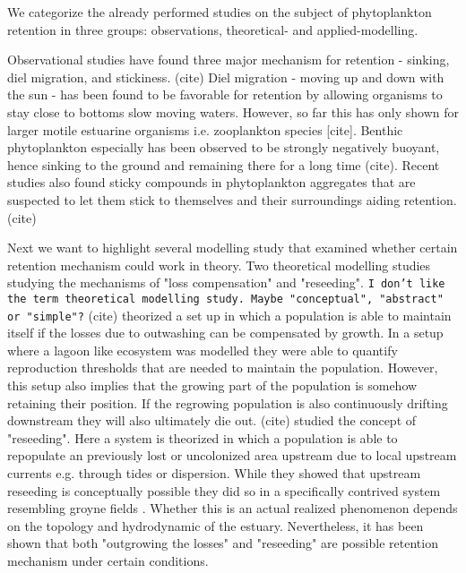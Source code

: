 

We categorize the already performed studies on the subject of phytoplankton retention in three groups: observations, theoretical- and applied-modelling.

Observational studies have found three major mechanism for retention - sinking, diel migration, and stickiness. (cite)
Diel migration - moving up and down with the sun -  has been found to be favorable for retention by allowing organisms to stay close to bottoms slow moving waters.
However, so far this has only shown for larger motile estuarine organisms i.e. zooplankton species [cite].
Benthic phytoplankton especially has been observed to be strongly negatively buoyant, hence sinking to the ground and remaining there for a long time (cite).
Recent studies also found sticky compounds in phytoplankton aggregates that are suspected to let them stick to themselves and their surroundings aiding retention. (cite)



Next we want to highlight several modelling study that examined whether certain retention mechanism could work in theory.
Two theoretical modelling studies studying the mechanisms of "loss compensation" and "reseeding".
\texttt{I don't like the term theoretical modelling study. Maybe "conceptual", "abstract" or "simple"?}
(cite) theorized a set up in which a population is able to maintain itself if the losses due to outwashing can be compensated by growth.
In a setup where a lagoon like ecosystem was modelled they were able to quantify reproduction thresholds that are needed to maintain the population.
However, this setup also implies that the growing part of the population is somehow retaining their position.
If the regrowing population is also continuously drifting downstream they will also ultimately die out.
(cite) studied the concept of "reseeding".
Here a system is theorized in which a population is able to repopulate an previously 
lost or uncolonized area upstream due to local upstream currents e.g. through tides or dispersion.
While they showed that upstream reseeding is conceptually possible they did so in a specifically contrived system resembling groyne fields .
Whether this is an actual realized phenomenon depends on the topology and hydrodynamic of the estuary.
Nevertheless, it has been shown that both "outgrowing the losses" and "reseeding" are possible retention mechanism under certain conditions.

